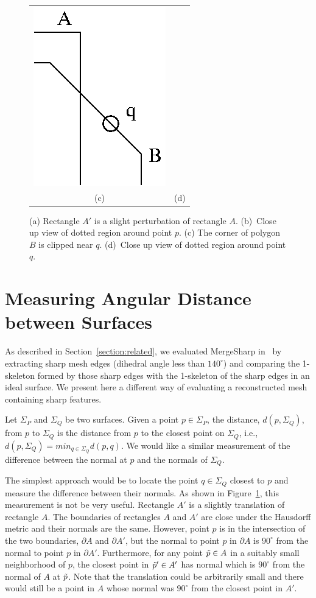 \begin{figure}[t]
\begin{tabular}{cc}
\qquad
\includegraphics[width=0.4\linewidth]{images/polyBclose.eps} \\
(c) & (d)
\end{tabular}

\caption{(a) Rectangle $A'$ is a slight perturbation of rectangle $A$.
(b)~Close up view of dotted region around point $p$.
(c) The corner of polygon $B$ is clipped near $q$.
(d)~Close up view of dotted region around point $q$.}
\label{fig:rect}

\end{figure}


\section{Measuring Angular Distance between Surfaces}
\label{section:angular_distance}

As described in Section~\ref{section:related},
we evaluated MergeSharp in~\cite{bw-cisec-13}
by extracting sharp mesh edges (dihedral angle less than $140^\circ$)
and comparing the 1-skeleton formed
by those sharp edges with the 1-skeleton of the sharp edges 
in an ideal surface.
We present here a different way of evaluating 
a reconstructed mesh containing sharp features.

Let $\Sigma_P$ and $\Sigma_Q$ be two surfaces.
Given a point $p \in \Sigma_P$,
the distance, $d(p,\Sigma_Q)$, from $p$ to $\Sigma_Q$
is the distance from $p$ to the closest point on $\Sigma_Q$,
i.e., $d(p, \Sigma_Q) = min_{q \in \Sigma_Q} d(p,q)$.
We would like a similar measurement of the difference between
the normal at $p$ and the normals of $\Sigma_Q$.

The simplest approach would be to locate the point $q \in \Sigma_Q$
closest to $p$ and measure the difference 
between their normals.
As shown in Figure~\ref{fig:rect},
this measurement is not be very useful.
Rectangle $A'$ is a slightly translation of rectangle $A$.
The boundaries of rectangles $A$ and $A'$
are close under the Hausdorff metric and their normals are the same.
However, point $p$ is in the intersection of the two boundaries,
$\partial A$ and $\partial A'$,
but the normal to point $p$ in $\partial A$ is $90^\circ$
from the normal to point $p$ in $\partial A'$.
Furthermore, for any point $\tilde{p} \in A$ in a suitably small neighborhood of $p$,
the closest point in $\tilde{p}' \in A'$ has normal which is $90^\circ$
from the normal of $A$ at $\tilde{p}$.
Note that the translation could be arbitrarily small
and there would still be a point in $A$ whose normal was $90^\circ$
from the closest point in $A'$.

